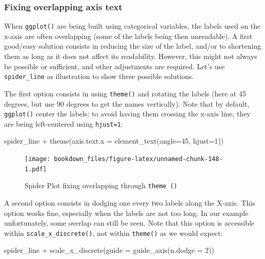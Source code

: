 \documentclass[
]{krantz}
\makeatletter
\newenvironment{Shaded}{\begin{snugshade}}{\end{snugshade}}
\newcommand{\AttributeTok}[1]{\textcolor[rgb]{0.61,0.61,0.61}{#1}}
\newcommand{\DecValTok}[1]{\textcolor[rgb]{0.06,0.06,0.06}{#1}}
\newcommand{\FunctionTok}[1]{\textcolor[rgb]{0,0,0}{#1}}
\newcommand{\NormalTok}[1]{#1}
\newcommand{\SpecialCharTok}[1]{\textcolor[rgb]{0,0,0}{#1}}
\newenvironment{kframe}{%
\medskip{}
\setlength{\fboxsep}{.8em}
 \def\at@end@of@kframe{}%
 \ifinner\ifhmode%
  \def\at@end@of@kframe{\end{minipage}}%
  \begin{minipage}{\columnwidth}%
 \fi\fi%
 \def\FrameCommand##1{\hskip\@totalleftmargin \hskip-\fboxsep
 \colorbox{shadecolor}{##1}\hskip-\fboxsep
     \hskip-\linewidth \hskip-\@totalleftmargin \hskip\columnwidth}%
 \MakeFramed {\advance\hsize-\width
   \@totalleftmargin\z@ \linewidth\hsize
   \@setminipage}}%
 {\par\unskip\endMakeFramed%
 \at@end@of@kframe}
\renewenvironment{Shaded}{\begin{kframe}}{\end{kframe}}
\makeatother
\begin{document}
\hypertarget{overlap}{%
\subsubsection*{Fixing overlapping axis text}\label{overlap}}


When \texttt{ggplot()} are being built using categorical variables, the labels used on the x-axis are often overlapping (some of the labels being then unreadable). A first good/easy solution consists in reducing the size of the label, and/or to shortening them as long as it does not affect its readability. However, this might not always be possible or sufficient, and other adjustments are required. Let's use \texttt{spider\_line} as illustration to show three possible solutions.

The first option consists in using \texttt{theme()} and rotating the labels (here at 45 degrees, but use 90 degrees to get the names vertically). Note that by default, \texttt{ggplot()} center the labels: to avoid having them crossing the x-axis line, they are being left-centered using \texttt{hjust=1}:

\begin{Shaded}
\begin{Highlighting}[]
\NormalTok{spider\_line }\SpecialCharTok{+} 
  \FunctionTok{theme}\NormalTok{(}\AttributeTok{axis.text.x =} \FunctionTok{element\_text}\NormalTok{(}\AttributeTok{angle=}\DecValTok{45}\NormalTok{, }\AttributeTok{hjust=}\DecValTok{1}\NormalTok{))}
\end{Highlighting}
\end{Shaded}

\begin{figure}
\centering
\texttt{[image: bookdown\_files/figure-latex/unnamed-chunk-148-1.pdf]}
\caption{\label{fig:unnamed-chunk-148}Spider Plot fixing overlapping through \texttt{theme\ ()}}
\end{figure}

A second option consists in dodging one every two labels along the X-axis. This option works fine, especially when the labels are not too long. In our example unfortunately, some overlap can still be seen. Note that this option is accessible within \texttt{scale\_x\_discrete()}, not within \texttt{theme()} as we would expect:

\begin{Shaded}
\begin{Highlighting}[]
\NormalTok{spider\_line }\SpecialCharTok{+} 
  \FunctionTok{scale\_x\_discrete}\NormalTok{(}\AttributeTok{guide =} \FunctionTok{guide\_axis}\NormalTok{(}\AttributeTok{n.dodge =} \DecValTok{2}\NormalTok{))}
\end{Highlighting}
\end{Shaded}
\end{document}
